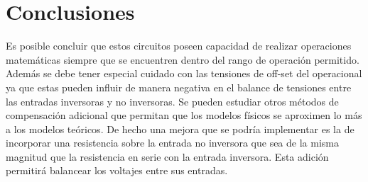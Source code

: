 \section{Conclusiones}
Es posible concluir que estos circuitos poseen capacidad de realizar operaciones matemáticas siempre que se encuentren dentro del rango de operación permitido. 
Además se debe tener especial cuidado con las tensiones de off-set del operacional ya que estas pueden influir de manera negativa en el balance de tensiones entre las entradas inversoras y no inversoras. Se pueden estudiar otros métodos de compensación adicional que permitan que los modelos físicos se aproximen lo más a los modelos teóricos. De hecho una mejora que se podría implementar es la de incorporar una resistencia sobre la entrada no inversora que sea de la misma magnitud que la resistencia en serie con la entrada inversora. Esta adición permitirá balancear los voltajes entre sus entradas.   



